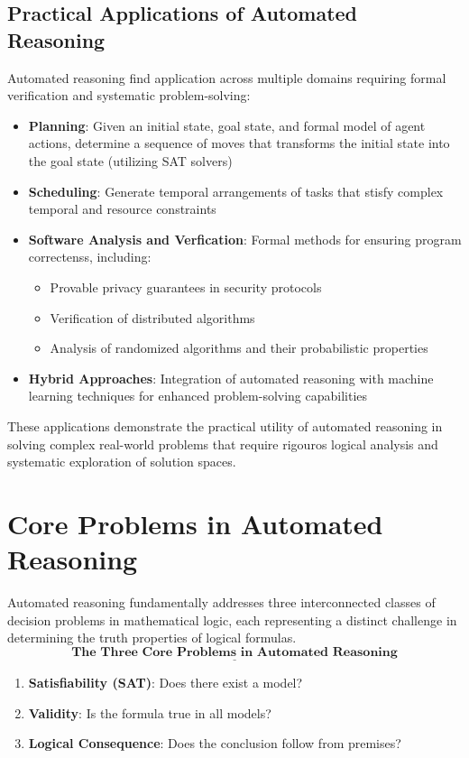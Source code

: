 \documentclass[a4paper]{article}
\theoremstyle{definition}
\begin{document}
\subsection{Practical Applications of Automated Reasoning}
Automated reasoning find application across multiple domains requiring formal verification and systematic problem-solving:
\begin{itemize}
	\item \textbf{Planning}: Given an initial state, goal state, and formal model of agent actions, determine a sequence of moves that transforms the initial state into the goal state (utilizing SAT solvers)
	\item \textbf{Scheduling}: Generate temporal arrangements of tasks that stisfy complex temporal and resource constraints 
	\item \textbf{Software Analysis and Verfication}: Formal methods for ensuring program correctenss, including:
	\begin{itemize}
		\item Provable privacy guarantees in security protocols 
		\item Verification of distributed algorithms
		\item Analysis of randomized algorithms and their probabilistic properties
	\end{itemize}
	\item \textbf{Hybrid Approaches}: Integration of automated reasoning with machine learning techniques for enhanced problem-solving capabilities
\end{itemize}
These applications demonstrate the practical utility of automated reasoning in solving complex real-world problems that require rigouros logical 
analysis and systematic exploration of solution spaces.
\section{Core Problems in Automated Reasoning}
Automated reasoning fundamentally addresses three interconnected classes of decision problems in mathematical logic, each representing a distinct 
challenge in determining the truth properties of logical formulas.
\[
	\underline{\textbf{The Three Core Problems in Automated Reasoning}}
\]
\begin{enumerate}
	\item \textbf{Satisfiability (SAT)}: Does there exist a model?
	\item \textbf{Validity}: Is the formula true in all models?
	\item \textbf{Logical Consequence}: Does the conclusion follow from premises?
\end{enumerate}
\end{document}
